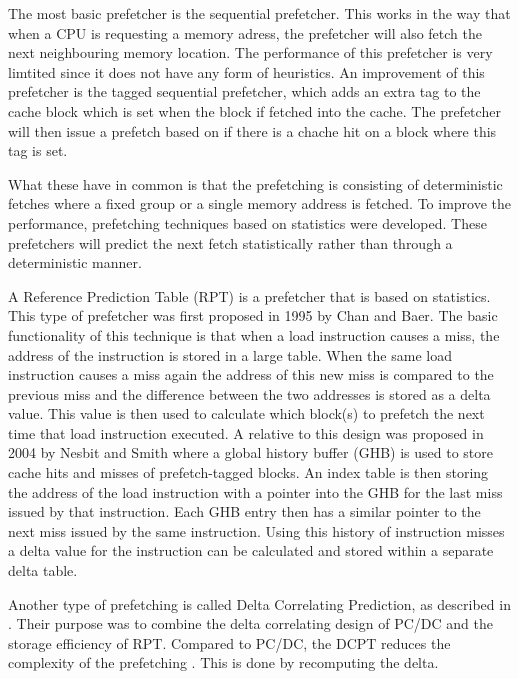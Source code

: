 The most basic prefetcher is the sequential prefetcher. This works in the way that when a CPU is requesting a memory adress, the prefetcher will also fetch the next neighbouring memory location. The performance of this prefetcher is very limtited since it does not have any form of heuristics. An improvement of this prefetcher is the tagged sequential prefetcher, which adds an extra tag to the cache block which is set when the block if fetched into the cache. The prefetcher will then issue a prefetch based on if there is a chache hit on a block where this tag is set.

What these have in common is that the prefetching is consisting of deterministic fetches where a fixed group or a single memory address is fetched. To improve the performance, prefetching techniques based on statistics were developed. These prefetchers will predict the next fetch statistically rather than through a deterministic manner.   

A Reference Prediction Table (RPT) is a prefetcher that is based on statistics. This type of prefetcher was first proposed in 1995 by Chan and Baer. The basic functionality of this technique is that when a load instruction causes a miss, the address of the instruction is stored in a large table. When the same load instruction causes a miss again the address of this new miss is compared to the previous miss and the difference between the two addresses is stored as a delta value. This value is then used to calculate which block(s) to prefetch the next time that load instruction executed. 
A relative to this design was proposed in 2004 by Nesbit and Smith where a global history buffer (GHB) is used to store cache hits and misses of prefetch-tagged blocks. An index table is then storing the address of the load instruction with a pointer into the GHB for the last miss issued by that instruction. Each GHB entry then has a similar pointer to the next miss issued by the same instruction. Using this history of instruction misses a delta value for the instruction can be calculated and stored within  a separate delta table.

Another type of prefetching is called Delta Correlating Prediction, as described in \cite{reference:jahre}. Their purpose was to combine the delta correlating design of PC/DC and the storage efficiency of RPT. Compared to PC/DC, the DCPT reduces the complexity of the prefetching . This is done by recomputing the delta.
